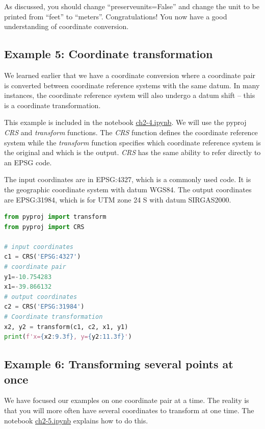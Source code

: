 \documentclass[a4paper , 12pt]{book}
\begin{document}
As discussed, you should change “preserve\textunderscore units=False” and change the unit to be printed from “feet” to “meters”. Congratulations! You now have a good understanding of coordinate conversion.

\subsection*{Example 5: Coordinate transformation}

We learned earlier that we have a coordinate conversion where a coordinate pair is converted between coordinate reference systems with the same datum. In many instances, the coordinate reference system will also undergo a datum shift – this is a coordinate transformation.

This example is included in the notebook \href{http://github.com}{ch2-4.ipynb}. We will use the pyproj \textit{CRS} and \textit{transform} functions. The \textit{CRS} function defines the coordinate reference system while the \textit{transform} function specifies which coordinate reference system is the original and which is the output. \textit{CRS} has the same ability to refer directly to an EPSG code.

The input coordinates are in EPSG:4327, which is a commonly used code. It is the geographic coordinate system with datum WGS84. The output coordinates are EPSG:31984, which is for UTM zone 24 S with datum SIRGAS2000.

\begin{center}
\begin{lstlisting}[language=Python, frame=single]
from pyproj import transform
from pyproj import CRS

# input coordinates
c1 = CRS('EPSG:4327')
# coordinate pair
y1=-10.754283
x1=-39.866132
# output coordinates
c2 = CRS('EPSG:31984')
# Coordinate transformation
x2, y2 = transform(c1, c2, x1, y1)
print(f'x={x2:9.3f}, y={y2:11.3f}')
\end{lstlisting}
\end{center}

\subsection*{Example 6: Transforming several points at once}

We have focused our examples on one coordinate pair at a time. The reality is that you will more often have several coordinates to transform at one time. The notebook \href{http://github.com}{ch2-5.ipynb} explains how to do this.
\end{document}
